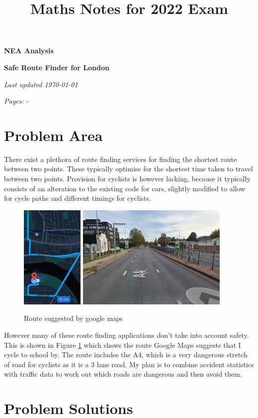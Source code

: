 \documentclass[11pt,twoside,a4paper]{article}
\title{Maths Notes for 2022 Exam}
\newcommand{\pagedifference}[2]{%
  \number\numexpr\getpagerefnumber{#2}-\getpagerefnumber{#1}\relax}
\begin{document}
\begin{center}

\thispagestyle{empty}

\vspace*{100pt}

\textbf{\Huge{NEA Analysis}}

\vspace{40pt}

\textbf{\huge{Safe Route Finder for London}}

\vspace{60pt}

{\small \textit{Last updated \today}}

{\small \textit{Pages: \pagedifference{start}{end}}}

\end{center}
\newpage
{
\setcounter{tocdepth}{2}
\tableofcontents
}
\label{start}
\newpage
\section{Problem Area}
There exist a plethora of route finding services for finding the shortest route between two points. These typically optimise for the shortest time taken to travel between two points. Provision for cyclists is however lacking, because it typically consists of an alteration to the existing code for cars, slightly modified to allow for cycle paths and different timings for cyclists.\\
\begin{figure}[t]
    \begin{center}
        \includegraphics[height=5cm]{route.jpg}
    \includegraphics[height=5cm]{dangerous.png}
\end{center}
    \caption{Route suggested by google maps}
    \label{route}
\end{figure}
However many of these route finding applications don't take into account safety. This is shown in Figure \ref{route} which shows the route Google Maps suggests that I cycle to school by. The route includes the A4, which is a very dangerous stretch of road for cyclists as it is a 3 lane road. 
My plan is to combine accident statistics with traffic data to work out which roads are dangerous and then avoid them. 
\section{Problem Solutions}
\label{end}
\end{document}
